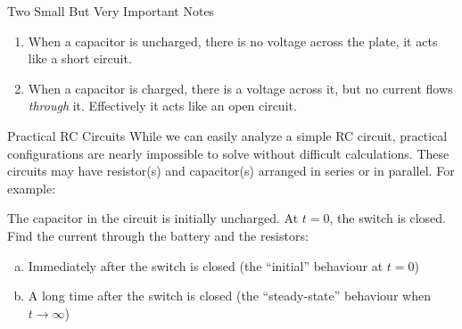 \documentclass[12pt,aspectratio=169]{beamer}
\begin{document}
\begin{frame}{Two Small But Very Important Notes}
  \begin{enumerate}
  \item When a capacitor is uncharged, there is no voltage across the plate,
    it acts like a short circuit.
  \item When a capacitor is charged, there is a voltage across it, but no
    current flows \emph{through} it. Effectively it acts like an open circuit.
  \end{enumerate}
\end{frame}



\begin{frame}{Practical RC Circuits}
  While we can easily analyze a simple RC circuit, practical configurations are
  nearly impossible to solve without difficult calculations. These circuits may
  have resistor(s) and capacitor(s) arranged in series or in parallel. For
  example:
  \begin{center}
  \end{center}
  The capacitor in the circuit is initially uncharged. At $t=0$, the switch is
  closed. Find the current through the battery and the resistors:
  \begin{enumerate}[(a)]
  \item Immediately after the switch is closed (the ``initial'' behaviour
    at $t=0$)
  \item A long time after the switch is closed (the ``steady-state''
    behaviour when $t\to\infty$)
  \end{enumerate}
\end{frame}
\end{document}
